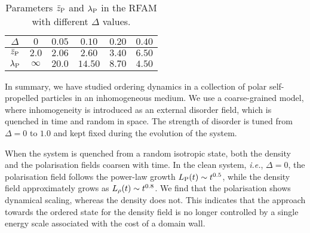 \documentclass[pre,twocolumn,amssymb,showpacs,superscriptaddress,notitlepage]{revtex4-1}
\begin{document}


\begin{table}[b]
\caption{Parameters $\bar z_{\rm P}$ and $\lambda_{\rm P}$ in the RFAM with different $\Delta$ values.}
\centering
\begin{tabular}{|c|c|c|c|c|c|}
\hline
$\Delta$ & $0$ & $0.05$ & $0.10$ & $0.20$ & $0.40$ \\
\hline
$\bar z_{\rm  P}$ & $2.0$ & $2.06$ & $2.60$ & $3.40$ & $6.50$ \\
\hline
$\lambda_{\rm  P}$ & $\infty$ & $20.0$ & $14.50$ & $8.70$ & $4.50$ \\
\hline
\end{tabular}
\label{table1}
\end{table}


In summary, we  have studied ordering dynamics in a collection of
polar self-propelled particles in an inhomogeneous medium.
 We use a coarse-grained model, where  
inhomogeneity is introduced as an external disorder field, which is quenched in time and random in space.
The strength of disorder is tuned from $\Delta =0$ to $1.0$ and kept fixed during the evolution of the system.

When the system is quenched from a random isotropic state, both the density and the 
polarisation fields coarsen with time.
In the clean system, {\it i.e.}, $\Delta=0$, the polarisation field follows the power-law growth $L_{\rm  P}(t) \sim t^{0.5}$,
while the density field approximately grows as $L_{\rm \rho}(t) \sim t^{0.8}$. 
We find that the  polarisation shows dynamical scaling, whereas the density does not.
This indicates that the approach towards the  ordered state for the density field is no longer controlled
by a single energy scale associated with the cost of a domain wall.
\end{document}
